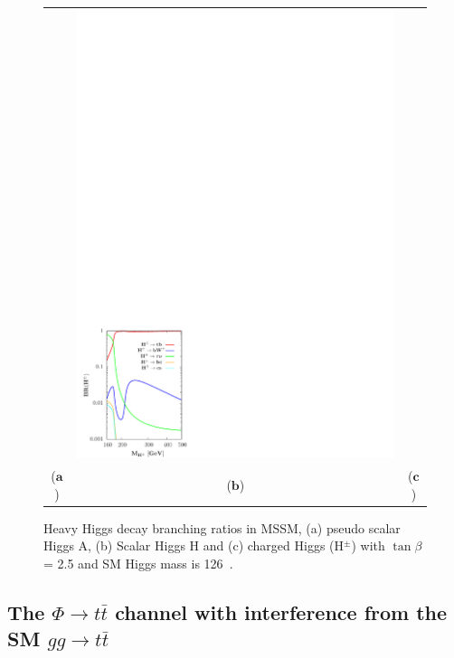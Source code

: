 \begin{figure}[htp]
\begin{tabular}{ccc}
& \hspace{-0.65cm} \includegraphics[trim={0.0cm 0cm 13cm 21cm},clip, scale=0.58]{fig/sm_beyond/H_pm_br.pdf}\\
  \qquad ($\mathbf{a}$)\qquad\qquad&($\mathbf{b}$)\qquad\qquad&($\mathbf{c}$)\\
\end{tabular}
\caption{Heavy Higgs decay branching ratios in MSSM, (a) pseudo scalar Higgs A, (b) Scalar Higgs H and (c) charged Higgs (H$^{\pm}$) with $\tan\beta$ = 2.5 and SM Higgs mass is 126~\cite{Djouadi:2013vqa}. }\label{fig:Heavy_Hpm_BR}
\end{figure}
\noindent \subsection{The $\Phi \rightarrow t\bar{t}$ channel with interference from the SM $gg \rightarrow t\bar{t}$}
